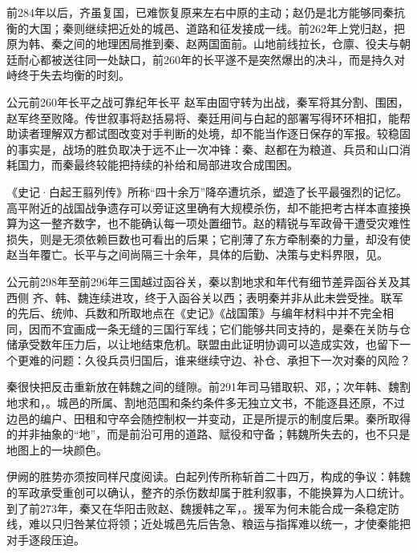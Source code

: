 前284年以后，齐虽复国，已难恢复原来左右中原的主动；赵仍是北方能够同秦抗衡的大国；秦则继续把近处的城邑、道路和征发接成一线。前262年上党归赵，把原为韩、秦之间的地理困局推到秦、赵两国面前。山地前线拉长，仓廪、役夫与朝廷耐心都被送往同一处缺口，前260年的长平遂不是突然爆出的决斗，而是持久对峙终于失去均衡的时刻。

\begin{event}{公元前260年}{长平之战}{可靠纪年}{长平}
赵军由固守转为出战，秦军将其分割、围困，赵军终至败降。传世叙事将赵括易将、秦廷用间与白起的部署写得环环相扣，能帮助读者理解双方都试图改变对手判断的处境，却不能当作逐日保存的军报。较稳固的事实是，战场的胜负取决于远不止一次冲锋：秦、赵都在为粮道、兵员和山口消耗国力，而秦最终较能把持续的补给和局部进攻合成围困。

《史记·白起王翦列传》所称“四十余万”降卒遭坑杀，塑造了长平最强烈的记忆。高平附近的战国战争遗存可以旁证这里确有大规模杀伤，却不能把考古样本直接换算为这一整齐数字，也不能确认每一项处置细节。赵的精锐与军政骨干遭受灾难性损失，则是无须依赖巨数也可看出的后果；它削薄了东方牵制秦的力量，却没有使赵当年覆亡。长平与之间尚隔三十余年，具体的后勤、决策与史料界限，见。
\end{event}

\begin{event}{公元前298年至前296年}{三国越过函谷关，秦以割地求和}{年代有细节差异}{函谷关及其西侧}
齐、韩、魏连续进攻，终于入函谷关以西；表明秦并非从此未尝受挫。联军的先后、统帅、兵数和所取地点在《史记》《战国策》与编年材料中并不完全相同，因而不宜画成一条无缝的三国行军线；它们能够共同支持的，是秦在关防与仓储承受数年压力后，以让地结束危机。联盟由此证明协调可以造成实效，也留下一个更难的问题：久役兵员归国后，谁来继续守边、补仓、承担下一次对秦的风险？
\end{event}

秦很快把反击重新放在韩魏之间的缝隙。前291年司马错取轵、邓，；次年韩、魏割地求和，。城邑的所属、割地范围和条约条件多无独立文书，不能逐县还原，不过边邑的编户、田租和守卒会随控制权一并变动，正是所提示的制度后果。秦所取得的并非抽象的“地”，而是前沿可用的道路、赋役和守备；韩魏所失去的，也不只是地图上的一块颜色。

伊阙的胜势亦须按同样尺度阅读。白起列传所称斩首二十四万，构成的争议：韩魏的军政承受重创可以确认，整齐的杀伤数却属于胜利叙事，不能换算为人口统计。到了前273年，秦又在华阳击败赵、魏援韩之军，。援军为何未能合成一条稳定防线，难以只归咎某位将领；近处城邑先后告急、粮运与指挥难以统一，才使秦能把对手逐段压迫。

